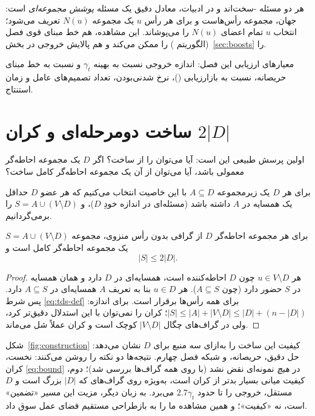 هر دو مسئله -سخت‌اند و در ادبیات،  معادل دقیق یک مسئله
\emph{پوشش مجموعه‌ای} است: جهان، مجموعه رأس‌هاست و برای هر رأس $u$ یک مجموعه
$N(u)$ تعریف می‌شود؛ انتخاب $u$ تمام اعضای $N(u)$ را می‌پوشاند. این مشاهده،
هم خط مبنای قوی فصل (الگوریتم ) را ممکن می‌کند و هم پالایش خروجی در
بخش~\ref{sec:boosts} را.

معیارهای ارزیابی این فصل: اندازه خروجی نسبت به بهینه $\gamma_t$ و نسبت به
خط مبنای حریصانه، نسبت به بازارزیابی ()، نرخ شدنی‌بودن، تعداد تصمیم‌های
عامل و زمان استنتاج.

\section{ساخت دومرحله‌ای و کران $2|D|$}
\label{sec:construction}

اولین پرسش طبیعی این است: آیا می‌توان  را از  ساخت؟ اگر $D$ یک
مجموعه احاطه‌گر معمولی باشد، آیا می‌توان از آن یک مجموعه احاطه‌گر کامل ساخت؟

برای هر $D$ یک زیرمجموعه $A\subseteq D$ با این خاصیت انتخاب می‌کنیم که هر عضو
$D$ حداقل یک همسایه در $A$ داشته باشد (مسئله‌ای در اندازه خودِ $D$)، و
$S=A\cup (V\setminus D)$ را برمی‌گردانیم.

\begin{theorem}
\label{thm:bound}
برای هر مجموعه احاطه‌گر $D$ از گرافی بدون رأس منزوی، مجموعه $S=A\cup(V\setminus D)$
یک مجموعه احاطه‌گر کامل است و
\begin{equation}
|S| \le 2|D| .
\label{eq:bound}
\end{equation}
\end{theorem}

\begin{proof}
هر $u\in V\setminus D$ چون $D$ احاطه‌کننده است، همسایه‌ای در $D$ دارد و همان همسایه
در $S$ حضور دارد (چون $A\subseteq S$). هر $u\in D$ بنا به تعریف $A$ همسایه‌ای در
$A\subseteq S$ دارد. پس شرط \eqref{eq:tds-def} برای همه رأس‌ها برقرار است. برای
اندازه: $|S|\le |A|+|V\setminus D|\le |D|+(n-|D|)$؛ کران را نمی‌توان با این
استدلال دقیق‌تر کرد، ولی در گراف‌های چگال $|V\setminus D|$ کوچک است و کران
عملاً شل می‌ماند.
\end{proof}

شکل~\ref{fig:construction} کیفیت این ساخت را به‌ازای سه منبع برای $D$ نشان می‌دهد:
حل دقیق، حریصانه، و شبکه فصل چهارم. نتیجه‌ها دو نکته را روشن می‌کنند: نخست،
کران \eqref{eq:bound} در \emph{هیچ} نمونه‌ای نقض نشد (با  روی همه
گراف‌ها بررسی شد)؛ دوم، کیفیت میانی بسیار بدتر از کران است، به‌ویژه روی گراف‌های
 که $|D|$ بزرگ است و $D$ مستقل، خروجی را تا حدود $2.7\gamma_t$ می‌برد.
به زبان دیگر، مزیت این مسیر «تضمین» است، نه «کیفیت»؛ و همین مشاهده ما را به
بازطراحی مستقیم فضای عمل سوق داد.

